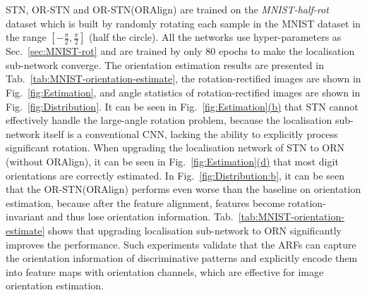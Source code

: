 \documentclass[10pt,twocolumn,letterpaper]{article}
\begin{document}
    STN, OR-STN and OR-STN(ORAlign) are trained on the \textit{MNIST-half-rot} dataset which is built by randomly rotating each sample in the MNIST dataset in the range $[-\frac{\pi}{2}, \frac{\pi}{2}]$ (half the circle). All the networks use hyper-parameters as Sec.~\ref{sec:MNIST-rot} and are trained by only 80 epochs to make the localisation sub-network converge. The orientation estimation results are presented in Tab.~\ref{tab:MNIST-orientation-estimate}, the rotation-rectified images are shown in Fig.~\ref{fig:Estimation}, and angle statistics of rotation-rectified images are shown in Fig.~\ref{fig:Distribution}. It can be seen in Fig.~\hyperref[fig:Estimation]{\ref*{fig:Estimation}(b)} that STN cannot effectively handle the large-angle rotation problem, because the localisation sub-network itself is a conventional CNN, lacking the ability to explicitly process significant rotation. When upgrading the localisation network of STN to ORN (without ORAlign), it can be seen in Fig.~\hyperref[fig:Estimation]{\ref*{fig:Estimation}(d)} that most digit orientations are correctly estimated. In Fig.~\ref{fig:Distribution:b}, it can be seen that the OR-STN(ORAlign) performs even worse than the baseline on orientation estimation, because after the feature alignment, features become rotation-invariant and thus lose orientation information.
    Tab.~\ref{tab:MNIST-orientation-estimate} shows that upgrading localisation sub-network to ORN significantly improves the performance. Such experiments validate that the ARFs can capture the orientation information of discriminative patterns and explicitly encode them into feature maps with orientation channels, which are effective for image orientation estimation.
\end{document}
